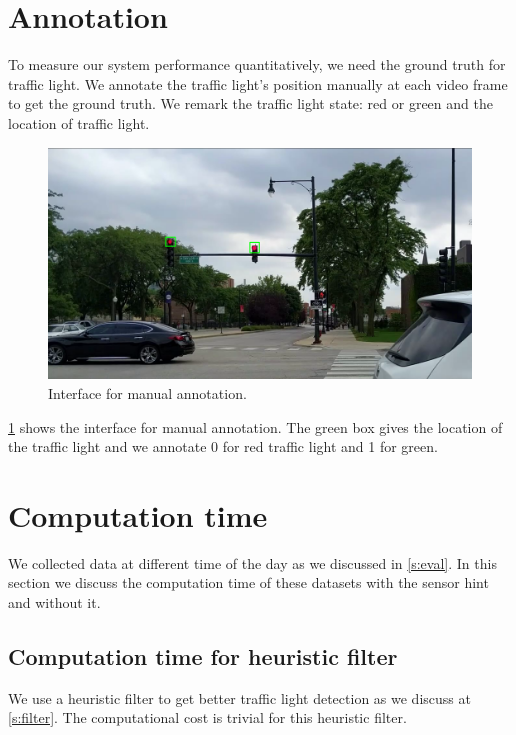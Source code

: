 \section{Annotation}
To measure our system performance quantitatively, we need the ground truth for traffic light.
We annotate the traffic light's position manually at each video frame to get the ground truth.
We remark the traffic light state: red or green and the location of traffic light.

\begin{figure}[h!]
\centering
\includegraphics[width=5.2in]{images/annotation.png}
\caption{Interface for manual annotation.}
\label{f:annotate}
\end{figure}

\ref{f:annotate} shows the interface for manual annotation.
The green box gives the location of the traffic light and we annotate 0 for red traffic light and 1 for green.

\section{Computation time}
We collected data at different time of the day as we discussed in \ref{s:eval}.
In this section we discuss the computation time of these datasets with the sensor hint and without it.

\subsection{Computation time for heuristic filter}

We use a heuristic filter to get better traffic light detection as we discuss at \ref{s:filter}.
The computational cost is trivial for this heuristic filter.

